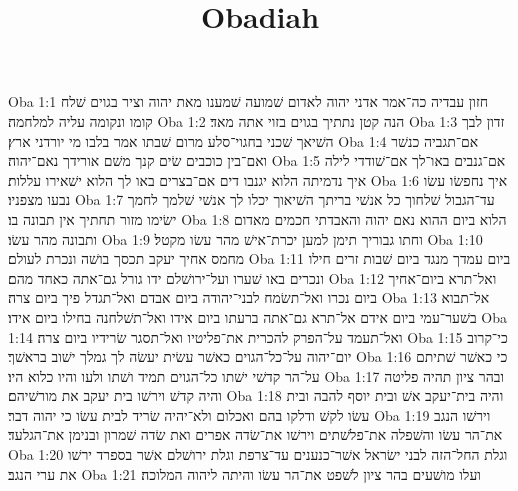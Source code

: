 

\title{Obadiah}

Oba 1:1  חזון עבדיה כה־אמר אדני יהוה לאדום שׁמועה שׁמענו מאת יהוה וציר בגוים שׁלח קומו ונקומה עליה למלחמה׃
Oba 1:2  הנה קטן נתתיך בגוים בזוי אתה מאד׃
Oba 1:3  זדון לבך השׁיאך שׁכני בחגוי־סלע מרום שׁבתו אמר בלבו מי יורדני ארץ׃
Oba 1:4  אם־תגביה כנשׁר ואם־בין כוכבים שׂים קנך משׁם אורידך נאם־יהוה׃
Oba 1:5  אם־גנבים באו־לך אם־שׁודדי לילה איך נדמיתה הלוא יגנבו דים אם־בצרים באו לך הלוא ישׁאירו עללות׃
Oba 1:6  איך נחפשׂו עשׂו נבעו מצפניו׃
Oba 1:7  עד־הגבול שׁלחוך כל אנשׁי בריתך השׁיאוך יכלו לך אנשׁי שׁלמך לחמך ישׂימו מזור תחתיך אין תבונה בו׃
Oba 1:8  הלוא ביום ההוא נאם יהוה והאבדתי חכמים מאדום ותבונה מהר עשׂו׃
Oba 1:9  וחתו גבוריך תימן למען יכרת־אישׁ מהר עשׂו מקטל׃
Oba 1:10  מחמס אחיך יעקב תכסך בושׁה ונכרת לעולם׃
Oba 1:11  ביום עמדך מנגד ביום שׁבות זרים חילו ונכרים באו שׁערו ועל־ירושׁלם ידו גורל גם־אתה כאחד מהם׃
Oba 1:12  ואל־תרא ביום־אחיך ביום נכרו ואל־תשׂמח לבני־יהודה ביום אבדם ואל־תגדל פיך ביום צרה׃
Oba 1:13  אל־תבוא בשׁער־עמי ביום אידם אל־תרא גם־אתה ברעתו ביום אידו ואל־תשׁלחנה בחילו ביום אידו׃
Oba 1:14  ואל־תעמד על־הפרק להכרית את־פליטיו ואל־תסגר שׂרידיו ביום צרה׃
Oba 1:15  כי־קרוב יום־יהוה על־כל־הגוים כאשׁר עשׂית יעשׂה לך גמלך ישׁוב בראשׁך׃
Oba 1:16  כי כאשׁר שׁתיתם על־הר קדשׁי ישׁתו כל־הגוים תמיד ושׁתו ולעו והיו כלוא היו׃
Oba 1:17  ובהר ציון תהיה פליטה והיה קדשׁ וירשׁו בית יעקב את מורשׁיהם׃
Oba 1:18  והיה בית־יעקב אשׁ ובית יוסף להבה ובית עשׂו לקשׁ ודלקו בהם ואכלום ולא־יהיה שׂריד לבית עשׂו כי יהוה דבר׃
Oba 1:19  וירשׁו הנגב את־הר עשׂו והשׁפלה את־פלשׁתים וירשׁו את־שׂדה אפרים ואת שׂדה שׁמרון ובנימן את־הגלעד׃
Oba 1:20  וגלת החל־הזה לבני ישׂראל אשׁר־כנענים עד־צרפת וגלת ירושׁלם אשׁר בספרד ירשׁו את ערי הנגב׃
Oba 1:21  ועלו מושׁעים בהר ציון לשׁפט את־הר עשׂו והיתה ליהוה המלוכה׃


